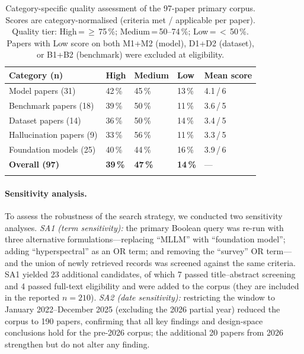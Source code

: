 \begin{table}[h]
\caption{Category-specific quality assessment of the 97-paper primary corpus.
Scores are category-normalised (criteria met / applicable per paper).
Quality tier: High\,=\,$\geq$\,75\,\%; Medium\,=\,50--74\,\%; Low\,=\,$<$\,50\,\%.
Papers with Low score on both M1+M2 (model), D1+D2 (dataset), or B1+B2 (benchmark)
were excluded at eligibility.
}\label{tab:quality}
\small\setlength\tabcolsep{3pt}
\begin{tabular*}{\textwidth}{@{\extracolsep\fill}p{4.2cm}p{1.1cm}p{1.2cm}p{0.9cm}p{1.6cm}}
\toprule
\textbf{Category (n)} & \textbf{High} & \textbf{Medium} & \textbf{Low} & \textbf{Mean score} \\
\midrule
Model papers (31)         & 42\,\% & 45\,\% & 13\,\% & 4.1\,/\,6 \\
Benchmark papers (18)     & 39\,\% & 50\,\% & 11\,\% & 3.6\,/\,5 \\
Dataset papers (14)       & 36\,\% & 50\,\% & 14\,\% & 3.4\,/\,5 \\
Hallucination papers (9)  & 33\,\% & 56\,\% & 11\,\% & 3.3\,/\,5 \\
Foundation models (25)    & 40\,\% & 44\,\% & 16\,\% & 3.9\,/\,6 \\
\midrule
\textbf{Overall (97)} & \textbf{39\,\%} & \textbf{47\,\%} & \textbf{14\,\%} & --- \\
\botrule
\end{tabular*}
\end{table}

\paragraph{Sensitivity analysis.}
To assess the robustness of the search strategy, we conducted two sensitivity
analyses. \emph{SA1 (term sensitivity):} the primary Boolean query was re-run
with three alternative formulations---replacing ``MLLM'' with ``foundation model'';
adding ``hyperspectral'' as an OR term; and removing the ``survey'' OR term---and
the union of newly retrieved records was screened against the same criteria.
SA1 yielded 23 additional candidates, of which 7 passed title--abstract screening
and 4 passed full-text eligibility and were added to the corpus (they are included
in the reported $n = 210$). \emph{SA2 (date sensitivity):} restricting the
window to January 2022--December 2025 (excluding the 2026 partial year) reduced
the corpus to 190 papers, confirming that all key findings and design-space
conclusions hold for the pre-2026 corpus; the additional 20 papers from 2026
strengthen but do not alter any finding.

